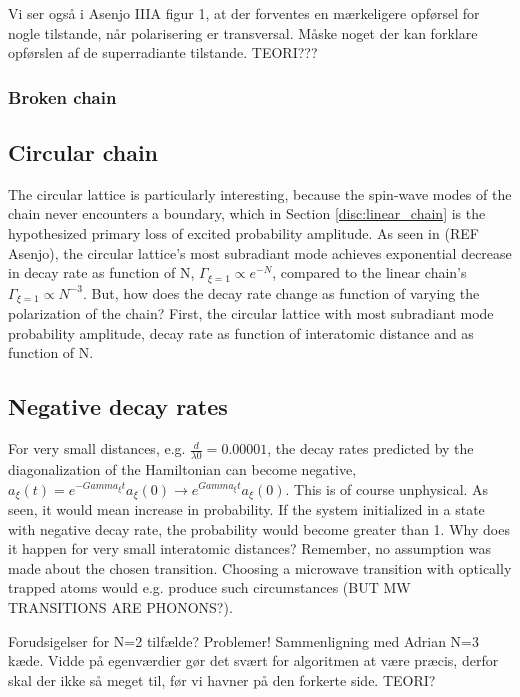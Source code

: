 \documentclass{article}
\begin{document}
Vi ser også i Asenjo IIIA figur 1, at der forventes en mærkeligere opførsel for nogle tilstande, når polarisering er transversal. Måske noget der kan forklare opførslen af de superradiante tilstande. TEORI???

\subsubsection{Broken chain}\label{disc:linear_broken}

\subsection{Circular chain}\label{disc:circular}

The circular lattice is particularly interesting, because the spin-wave modes of the chain never encounters a boundary, which in Section \ref{disc:linear_chain} is the hypothesized primary loss of excited probability amplitude. As seen in (REF Asenjo), the circular lattice's most subradiant mode achieves exponential decrease in decay rate as function of N, $\Gamma_{\xi = 1} \propto e^{-N}$, compared to the linear chain's $\Gamma_{\xi=1} \propto N^{-3}$. But, how does the decay rate change as function of varying the polarization of the chain? First, the circular lattice with most subradiant mode probability amplitude, decay rate as function of interatomic distance and as function of N. 

\subsection{Negative decay rates}

For very small distances, e.g. $\frac{d}{\lambda0} = 0.00001$, the decay rates predicted by the diagonalization of the Hamiltonian can become negative, $a_\xi(t)=e^{-Gamma_\xi t} a_\xi (0) \rightarrow e^{Gamma_\xi t} a_\xi (0)$. This is of course unphysical. As seen, it would mean increase in probability. If the system initialized in a state with negative decay rate, the probability would become greater than 1. Why does it happen for very small interatomic distances? Remember, no assumption was made about the chosen transition. Choosing a microwave transition with optically trapped atoms would e.g. produce such circumstances (BUT MW TRANSITIONS ARE PHONONS?). 

Forudsigelser for N=2 tilfælde? Problemer! Sammenligning med Adrian N=3 kæde. Vidde på egenværdier gør det svært for algoritmen at være præcis, derfor skal der ikke så meget til, før vi havner på den forkerte side. TEORI?
\end{document}

